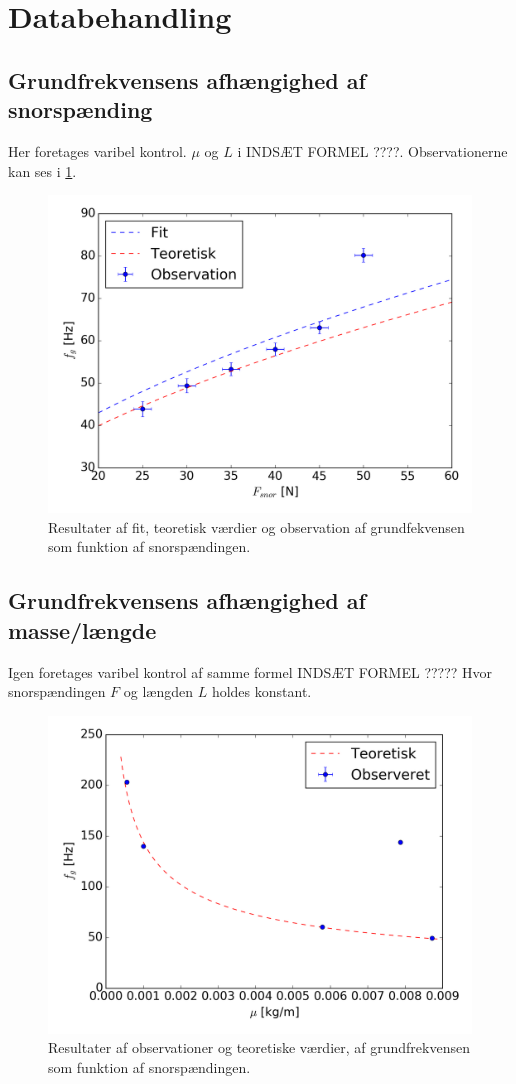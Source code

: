 \documentclass[A2_main.tex]{subfiles}
\begin{document}
\section{Databehandling}
\subsection{Grundfrekvensens afhængighed af snorspænding}
Her foretages varibel kontrol. $\mu$ og $L$ i INDSÆT FORMEL ????. Observationerne kan ses i \cref{fig:frekvensSNor}.
\begin{figure}[H]
    \includegraphics[width=\linewidth]{frekvensSnorSpaending.png}
    \caption{Resultater af fit, teoretisk værdier og observation af grundfekvensen som funktion af snorspændingen.}
    \label{fig:frekvensSNor}
\end{figure}

\subsection{Grundfrekvensens afhængighed af masse/længde}
Igen foretages varibel kontrol af samme formel INDSÆT FORMEL ????? Hvor snorspændingen $F$ og længden $L$ holdes konstant.
\begin{figure}[H]
    \includegraphics[width=\linewidth]{frekvensMu.png}
    \caption{Resultater af observationer og teoretiske værdier, af grundfrekvensen som funktion af snorspændingen.}
    \label{fig:frekvensMu}
\end{figure}
\end{document}
